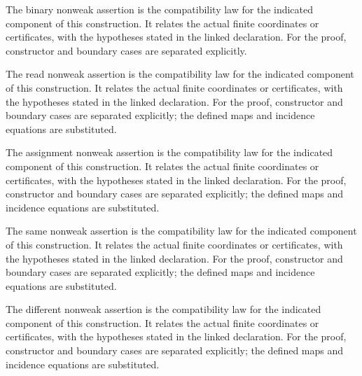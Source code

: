 The binary nonweak assertion is the compatibility law for the indicated component of this construction. It relates the actual finite coordinates or certificates, with the hypotheses stated in the linked declaration.
For the proof, constructor and boundary cases are separated explicitly.
\par{}

The read nonweak assertion is the compatibility law for the indicated component of this construction. It relates the actual finite coordinates or certificates, with the hypotheses stated in the linked declaration.
For the proof, constructor and boundary cases are separated explicitly; the defined maps and incidence equations are substituted.
\par{}

The assignment nonweak assertion is the compatibility law for the indicated component of this construction. It relates the actual finite coordinates or certificates, with the hypotheses stated in the linked declaration.
For the proof, constructor and boundary cases are separated explicitly; the defined maps and incidence equations are substituted.
\par{}

The same nonweak assertion is the compatibility law for the indicated component of this construction. It relates the actual finite coordinates or certificates, with the hypotheses stated in the linked declaration.
For the proof, constructor and boundary cases are separated explicitly; the defined maps and incidence equations are substituted.
\par{}

The different nonweak assertion is the compatibility law for the indicated component of this construction. It relates the actual finite coordinates or certificates, with the hypotheses stated in the linked declaration.
For the proof, constructor and boundary cases are separated explicitly; the defined maps and incidence equations are substituted.
\par{}

